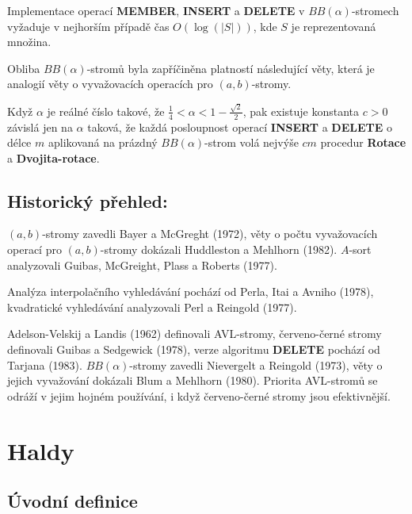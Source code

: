 \documentclass[a4paper,12pt]{article}
\begin{document}
\begin{veta}Implementace operací {\bf MEMBER}, {\bf INSERT} a {\bf DELETE }v $BB(\alpha )$-stromech vyžaduje v nejhorším 
případě čas $O(\log(|S|))$, kde $S$ je 
reprezentovaná množina.
\end{veta}

Obliba $BB(\alpha )$-stromů byla zapříčiněna 
platností následující věty, která je analogií věty o 
vyvažovacích operacích pro $(a,b)$-stromy.

\begin{veta}Když $\alpha$ je reálné číslo takové, že 
$\frac 14<\alpha <1-\frac {\sqrt 2}2$, pak existuje konstanta $c>
0$ závislá jen na 
$\alpha$ taková, že každá posloupnost operací {\bf INSERT} a {\bf DELETE }
o délce $m$ aplikovaná na prázdný $BB(\alpha )$-strom volá 
nejvýše $cm$ procedur {\bf Rotace} a {\bf Dvojita-rotace}.
\end{veta}

\subsection{Historický přehled:}

$(a,b)$-stromy zavedli Bayer a McGreght (1972),\newline 
věty o počtu vyvažovacích operací pro $(a,b)$-stromy dokázali 
Huddleston a Mehlhorn (1982).\newline 
$A$-sort analyzovali Guibas, McGreight, Plass a Roberts (1977).

Analýza interpolačního vyhledávání pochází od Perla, 
Itai a Avniho (1978),\newline 
kvadratické vyhledávání analyzovali Perl a Reingold (1977).

Adelson-Velskij a Landis (1962) definovali 
AVL-stromy,\newline 
červeno-černé stromy definovali Guibas a Sedgewick 
(1978),\newline 
verze algoritmu {\bf DELETE} pochází od Tarjana (1983).
$BB(\alpha )$-stromy zavedli Nievergelt a Reingold (1973),\newline 
věty o jejich vyvažování dokázali Blum a Mehlhorn (1980).\newline 
Priorita AVL-stromů se odráží v 
jejim hojném používání, i když červeno-černé stromy 
jsou efektivnější.

\section{Haldy}
\subsection{Úvodní definice}
\end{document}
